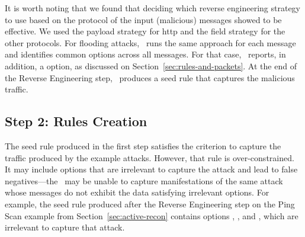 \documentclass[sigconf,review, anonymous]{acmart}
\begin{document}

It is worth noting that we found that deciding which reverse
engineering strategy to use based on the protocol of the input
(malicious) messages showed to be effective. We used the payload
strategy for http and the field strategy for the other protocols. For
flooding attacks, \tname\ runs the same approach for each message and
identifies common options across all messages. For that case,
\tname\ reports, in addition, a  option, as
discussed on Section~\ref{sec:rules-and-packets}.  At the end of the
Reverse Engineering step, \tname\ produces a seed rule that captures
the malicious traffic.





\subsection{Step 2: Rules Creation}
\label{sec:minimization}

The seed rule produced in the first step satisfies the criterion to
capture the traffic produced by the example attacks. However, that
rule is over-constrained.  It may include options that are irrelevant
to capture the attack and lead to false negatives---the \nids\ may be
unable to capture manifestations of the same attack whose messages do
not exhibit the data satisfying irrelevant options. For example, the
seed rule produced after the Reverse Engineering step on the Ping Scan
example from Section~\ref{sec:active-recon} contains options
, , and
, which are irrelevant to capture that attack.
\end{document}
